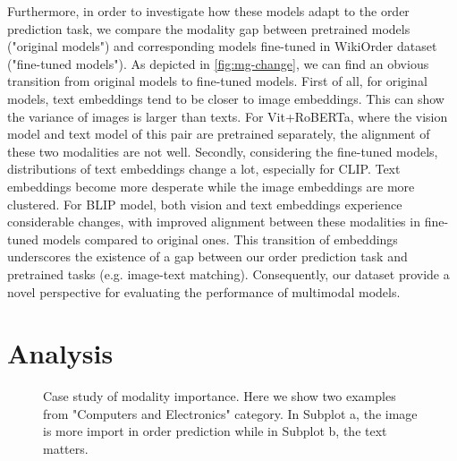 \documentclass[11pt]{article}
\begin{document}
Furthermore, in order to investigate how these models adapt to the order prediction task, we compare the modality gap between pretrained models ("original models") and corresponding models fine-tuned in WikiOrder dataset ("fine-tuned models"). As depicted in \autoref{fig:mg-change}, we can find an obvious transition from original models to fine-tuned models. First of all, for original models, text embeddings tend to be closer to image embeddings. This can show the variance of images is larger than texts. For Vit+RoBERTa, where the vision model and text model of this pair are pretrained separately, the alignment of these two modalities are not well. Secondly, considering the fine-tuned models, distributions of text embeddings change a lot, especially for CLIP. Text embeddings become more desperate while the image embeddings are more clustered. For BLIP model, both vision and text embeddings experience considerable changes, with improved alignment between these modalities in fine-tuned models compared to original ones. This transition of embeddings underscores the existence of a gap between our order prediction task and pretrained tasks (e.g. image-text matching). Consequently, our dataset provide a novel perspective for evaluating the performance of multimodal models.

\section{Analysis}

\begin{figure}[!tp]
\centering 
{}\hspace{10mm}
\caption{\label{fig:case}Case study of modality importance. Here we show two examples from "Computers and Electronics" category. In Subplot a, the image is more import in order prediction while in Subplot b, the text matters.}
\end{figure}
\end{document}
